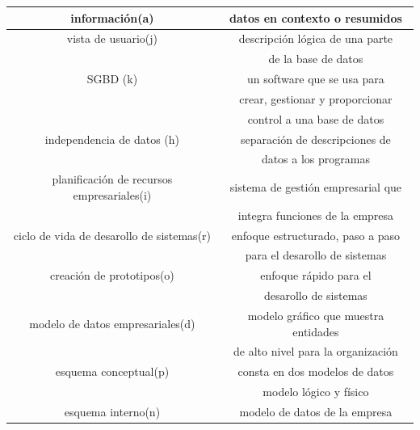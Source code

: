 \documentclass[letterpaper,12pt]{article}
\begin{document}
\begin{sloppypar}
\begin{itemize}
\begin{enumerate}
\begin{center}
\begin{tabular}[H]{|c|c|}
            información(a) & datos en contexto o resumidos\\ \hline
            
            vista de usuario(j) & descripción lógica de una parte\\
            & de la base de datos \\\hline
            
            SGBD (k) & un software que se usa para \\ 
            & crear, gestionar y proporcionar\\ 
            & control a una base de datos \\ \hline
            
            independencia de datos (h) & separación de descripciones de \\
            & datos a los programas \\ \hline
            
            planificación de recursos empresariales(i) & sistema de gestión empresarial que \\ 
            & integra funciones de la empresa\\ \hline
            
            ciclo de vida de desarollo de sistemas(r) & enfoque estructurado, paso a paso\\
            & para el desarollo de sistemas\\ \hline
            
            creación de prototipos(o) & enfoque rápido para el \\
            & desarollo de sistemas\\ \hline
            
            modelo de datos empresariales(d) & modelo gráfico que muestra entidades\\
            & de alto nivel para la organización\\ \hline
            
            esquema conceptual(p) & consta en dos modelos de datos\\
            & modelo lógico y físico\\\hline
            
            esquema interno(n) & modelo de datos de la empresa \\ \hline
            

\end{tabular}
\end{center}
\end{enumerate}
\end{itemize}
\end{sloppypar}
\end{document}
